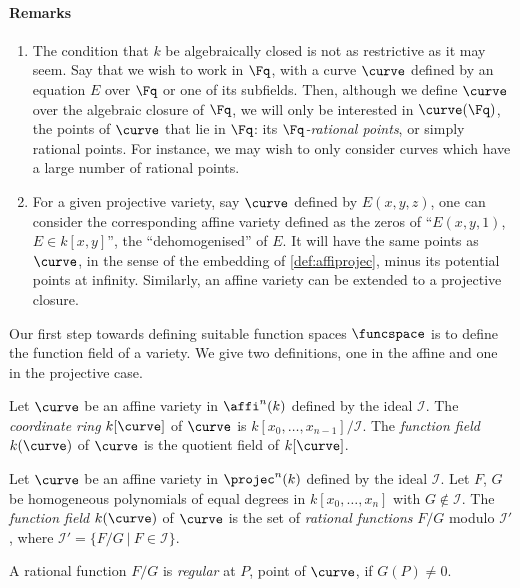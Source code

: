 \paragraph{Remarks}
\begin{enumerate}
\item The condition that $k$ be algebraically closed is not as restrictive as it may seem. Say that we wish to work in $\Fq$, with a
curve $\curve$ defined by an equation $E$ over $\Fq$ or one of its subfields. Then,
although we define $\curve$ over the algebraic closure of $\Fq$, we
will only be interested in $\curve(\Fq)$, the points of $\curve$ that lie in $\Fq$: its \emph{$\Fq$-rational points}, or simply rational points.
For instance, we may wish to only consider curves which have a large number of rational points.
\item For a given projective variety, say $\curve$ defined by $E(x,y,z)$, one can consider the corresponding affine variety defined as the zeros of ``$E(x,y,1)$,
$E \in k[x,y]$'', the ``dehomogenised'' of $E$. It will have the same points as $\curve$, in the sense of the embedding of \autoref{def:affiprojec}, minus its potential points at infinity.
Similarly, an affine variety can be extended to a projective closure.
\end{enumerate}

Our first step towards defining suitable function spaces $\funcspace$ is to define the function field of a variety.
We give two definitions, one in the affine and one in the projective case.

\begin{defi}
Let $\curve$ be an affine variety in $\affi^n(k)$ defined by the ideal $\mathcal{I}$. The \emph{coordinate ring} $k[\curve]$ of $\curve$ is $k[x_0, \ldots, x_{n-1}]/\mathcal{I}$.
The \emph{function field} $k(\curve)$ of $\curve$ is the quotient field of $k[\curve]$.
\end{defi}

\begin{defi}
Let $\curve$ be an affine variety in $\projec^n(k)$ defined by the ideal $\mathcal{I}$. Let $F$, $G$ be homogeneous polynomials of equal degrees in $k[x_0, \ldots, x_n]$
with $G \notin \mathcal{I}$. The \emph{function field} $k(\curve)$ of $\curve$ is the set of \emph{rational functions} $F/G$ modulo $\mathcal{I'}$,
where $\mathcal{I'} = \{F/G~|~ F \in \mathcal{I}\}$.

\noindent
A rational function $F/G$ is \emph{regular} at $P$, point of $\curve$, if $G(P) \neq 0$.
\end{defi}

